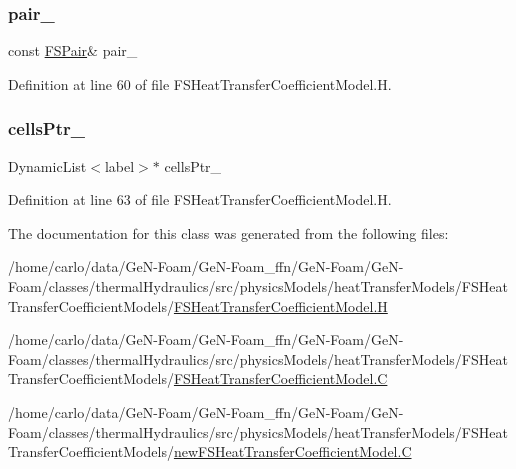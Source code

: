 \subsubsection{\texorpdfstring{pair\+\_\+}{pair\_}}
{\footnotesize\ttfamily const \hyperlink{classFoam_1_1FSPair}{F\+S\+Pair}\& pair\+\_\+\hspace{0.3cm}{\ttfamily [protected]}}



Definition at line 60 of file F\+S\+Heat\+Transfer\+Coefficient\+Model.\+H.

\mbox{\label{classFoam_1_1FSHeatTransferCoefficientModel_a737fc6c43e119dd399c1f4f972db6181}} 
\subsubsection{\texorpdfstring{cells\+Ptr\+\_\+}{cellsPtr\_}}
{\footnotesize\ttfamily Dynamic\+List$<$label$>$$\ast$ cells\+Ptr\+\_\+\hspace{0.3cm}{\ttfamily [protected]}}



Definition at line 63 of file F\+S\+Heat\+Transfer\+Coefficient\+Model.\+H.



The documentation for this class was generated from the following files\+:\begin{DoxyCompactItemize}
\item 
/home/carlo/data/\+Ge\+N-\/\+Foam/\+Ge\+N-\/\+Foam\+\_\+ffn/\+Ge\+N-\/\+Foam/\+Ge\+N-\/\+Foam/classes/thermal\+Hydraulics/src/physics\+Models/heat\+Transfer\+Models/\+F\+S\+Heat\+Transfer\+Coefficient\+Models/\hyperlink{FSHeatTransferCoefficientModel_8H}{F\+S\+Heat\+Transfer\+Coefficient\+Model.\+H}\item 
/home/carlo/data/\+Ge\+N-\/\+Foam/\+Ge\+N-\/\+Foam\+\_\+ffn/\+Ge\+N-\/\+Foam/\+Ge\+N-\/\+Foam/classes/thermal\+Hydraulics/src/physics\+Models/heat\+Transfer\+Models/\+F\+S\+Heat\+Transfer\+Coefficient\+Models/\hyperlink{FSHeatTransferCoefficientModel_8C}{F\+S\+Heat\+Transfer\+Coefficient\+Model.\+C}\item 
/home/carlo/data/\+Ge\+N-\/\+Foam/\+Ge\+N-\/\+Foam\+\_\+ffn/\+Ge\+N-\/\+Foam/\+Ge\+N-\/\+Foam/classes/thermal\+Hydraulics/src/physics\+Models/heat\+Transfer\+Models/\+F\+S\+Heat\+Transfer\+Coefficient\+Models/\hyperlink{newFSHeatTransferCoefficientModel_8C}{new\+F\+S\+Heat\+Transfer\+Coefficient\+Model.\+C}\end{DoxyCompactItemize}
